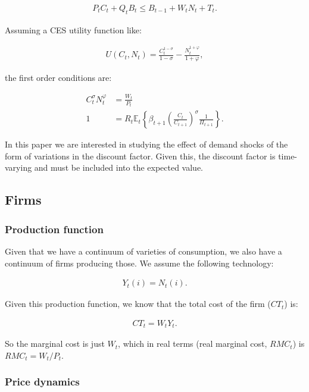 \documentclass[11pt]{article}
\numberwithin{equation}{section}
\begin{document}
\begin{align*}
P_tC_t+Q_tB_t\leq B_{t-1}+W_tN_t+T_t.
\end{align*}

Assuming a CES utility function like:

\begin{align*}
U(C_t,N_t)=\frac{C_t^{1-\sigma}}{1-\sigma}-\frac{N_t^{1+\varphi}}{1+\varphi},
\end{align*}

\noindent the first order conditions are:

\begin{align*}
C_t^{\sigma}N_t^{\varphi}&=\frac{W_t}{P_t}\\
1&=R_t\mathbb{E}_t\left\{\beta_{t+1}\left(\frac{C_t}{C_{t+1}}\right)^{\sigma}\frac{1}{\Pi_{t+1}}\right\}.
\end{align*}

In this paper we are interested in studying the effect of demand shocks of the form of variations in the discount factor. Given this, the discount factor is time-varying and must be included into the expected value.

\subsection{Firms}

\subsubsection{Production function}

Given that we have a continuum of varieties of consumption, we also have a continuum of firms producing those. We assume the following technology:

\begin{align*}
Y_t(i)=N_t(i).
\end{align*}

Given this production function, we know that the total cost of the firm ($CT_t$) is:

\begin{align*}
CT_t=W_tY_t.
\end{align*}

So the marginal cost is just $W_t$, which in real terms (real marginal cost, $RMC_t$) is $RMC_t=W_t/P_t$.

\subsubsection{Price dynamics}
\end{document}

